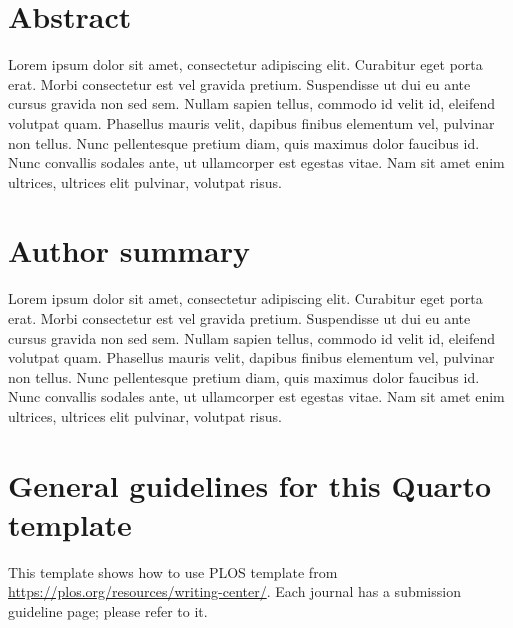 \documentclass[
  10pt,
  letterpaper,
]{article}
\begin{document}
\section*{Abstract}
Lorem ipsum dolor sit amet, consectetur adipiscing elit. Curabitur eget
porta erat. Morbi consectetur est vel gravida pretium. Suspendisse ut
dui eu ante cursus gravida non sed sem. Nullam sapien tellus, commodo id
velit id, eleifend volutpat quam. Phasellus mauris velit, dapibus
finibus elementum vel, pulvinar non tellus. Nunc pellentesque pretium
diam, quis maximus dolor faucibus id. Nunc convallis sodales ante, ut
ullamcorper est egestas vitae. Nam sit amet enim ultrices, ultrices elit
pulvinar, volutpat risus.

\section*{Author summary}
Lorem ipsum dolor sit amet, consectetur adipiscing elit. Curabitur eget
porta erat. Morbi consectetur est vel gravida pretium. Suspendisse ut
dui eu ante cursus gravida non sed sem. Nullam sapien tellus, commodo id
velit id, eleifend volutpat quam. Phasellus mauris velit, dapibus
finibus elementum vel, pulvinar non tellus. Nunc pellentesque pretium
diam, quis maximus dolor faucibus id. Nunc convallis sodales ante, ut
ullamcorper est egestas vitae. Nam sit amet enim ultrices, ultrices elit
pulvinar, volutpat risus.

\linenumbers

\section{General guidelines for this Quarto
template}\label{general-guidelines-for-this-quarto-template}

This template shows how to use PLOS template from
\url{https://plos.org/resources/writing-center/}. Each journal has a
submission guideline page; please refer to it.
\end{document}
